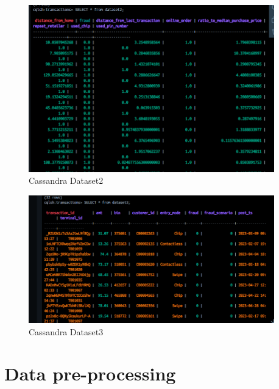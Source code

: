 \documentclass[12pt,a4paper, hidelinks]{article}
\begin{document}
\begin{figure}[htbp]
  \centering
  \includegraphics[width=0.95\textwidth]{images/m2-dataset-2.png}
  \caption{Cassandra Dataset2}
  \label{fig:cassandra2}
\end{figure}


\begin{figure}[htbp]
  \centering
  \includegraphics[width=0.95\textwidth]{images/m2-dataset-3.png}
  \caption{Cassandra Dataset3}
  \label{fig:cassandra3}
\end{figure}

\section{Data pre-processing}
\end{document}
